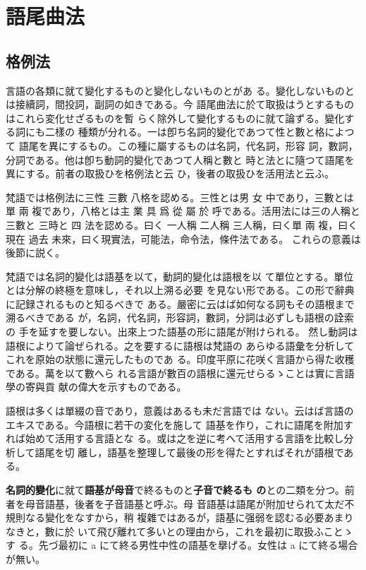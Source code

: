\chapter{語尾曲法}\label{cha:flection}
\section{格例法}
\numberParagraph
言語の各類に就て變化するものと變化しないものとがあ
る。變化しないものとは接續詞，間投詞，副詞の如きである。今
語尾曲法に於て取扱はうとするものはこれら変化せざるものを暫
らく除外して變化するものに就て論ずる。變化する詞にも二樣の
種類が分れる。一は卽ち名詞的變化であつて性と數と格によつて
語尾を異にするもの。この種に屬するものは名詞，代名詞，形容
詞，數詞，分詞である。他は卽ち動詞的變化であつて人稱と數と
時と法とに隨つて語尾を異にする。前者の取扱ひを格例法と云
ひ，後者の取扱ひを活用法と云ふ。

\numberParagraph
梵語では格例法に三性 三數 八格を認める。三性とは男
女 中であり，三數とは單 兩 複であり，八格とは主 業 具 爲
從 屬 於 呼である。活用法には三の人稱と 三數と 三時と 四
法を認める。曰く 一人稱 二人稱 三人稱，曰く單 兩 複，曰く
現在 過去 未來，曰く現實法，可能法，命令法，條件法である。
これらの意義は後節に説く。

\numberParagraph
梵語では名詞的變化は語基を以て，動詞的變化は語根を以
て單位とする。單位とは分解の終極を意味し，それ以上溯る必要
を見ない形である。この形で辭典に記録されるものと知るべきで
ある。嚴密に云はば如何なる詞もその語根まで溯るべきである
が，名詞，代名詞，形容詞，數詞，分詞は必ずしも語根の詮索の
手を延すを要しない。出來上つた語基の形に語尾が附けられる。
然し動詞は語根によりて論ぜられる。之を要するに語根は梵語の
あらゆる語彙を分析してこれを原始の狀態に還元したものであ
る。印度平原に花咲く言語から得た收穫である。萬を以て數へら
れる言語が數百の語根に還元せらるゝことは實に言語學の寄與貢
献の偉大を示すものである。

\numberParagraph
語根は多くは單綴の音であり，意義はあるも未だ言語では
ない。云はば言語のエキスである。今語根に若干の変化を施して
語基を作り，これに語尾を附加すれば始めて活用する言語とな
る。或は之を逆に考へて活用する言語を比較し分析して語尾を切
離し，語基を整理して最後の形を得たとすればそれが語根であ
る。

\numberParagraph
\textbf{名詞的變化}に就て\textbf{語基が母音}で終るものと\textbf{子音で終るも
  の}との二類を分つ。前者を母音語基，後者を子音語基と呼ぶ。母
音語基は語尾が附加せられて太だ不規則なる變化をなすから，稍
複雜ではあるが，語基に强弱を認むる必要あまりなきと，數に於
いて飛び離れて多いとの理由から，これを最初に取扱ふことゝす
る。先づ最初に a にて終る男性中性の語基を擧げる。女性は a
にて終る場合が無い。

